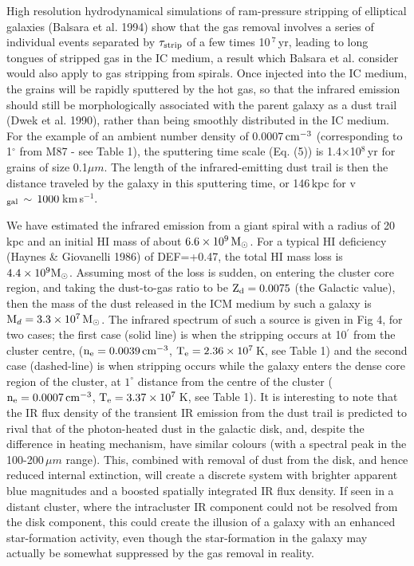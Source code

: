 \documentclass[]{aa}
\begin{document}
High resolution
hydrodynamical simulations of ram-pressure stripping of elliptical
galaxies (Balsara et al. 1994)
show that the gas removal involves a series of individual events
separated by $\tau_{\rm strip}$ of a few times 10$\,^{7}\,$yr, leading to
long tongues of stripped gas in the IC medium, a result which Balsara et al.
consider would also apply to gas stripping from spirals. Once injected into
the IC medium, the grains will be rapidly sputtered by the hot gas, so that
the infrared emission should still be morphologically
associated with the parent galaxy as a dust trail (Dwek et al. 1990),
rather than being smoothly distributed in the IC medium.
For the example
of an ambient number density of 0.0007$\,{\rm cm}^{-3}$ 
(corresponding to 1$^{\circ}$ from M87 - see Table 1), 
the sputtering time scale (Eq. (5)) is 
1.4$\times$10$^{8}\,$yr for grains of size 0.1${\mu}m$. 
The length of the infrared-emitting dust trail is then 
the distance traveled by the galaxy in this sputtering time, or 
146$\,$kpc for v$_{\rm gal}\,\sim\,1000\,$km$\,$s$^{-1}$.

We have estimated the infrared emission from a giant spiral with
a radius of 20\,kpc and an initial HI mass of 
about $6.6\times 10^9\,{\rm M}_{\odot}$. For a typical HI deficiency
(Haynes \& Giovanelli 1986)
of DEF=+0.47, the total HI mass loss is $4.4\times 10^9{\rm M}_{\odot}$.
Assuming most of the loss is sudden, on entering the cluster core region, 
and taking the
dust-to-gas ratio to be ${\rm Z}_{\rm d} = 0.0075$ (the Galactic value), 
then the mass of the dust released in the ICM medium by such a galaxy 
is ${\rm M}_d = 3.3\times 10^7\,{\rm M}_{\odot}$. 
The infrared spectrum of such a
source is given in Fig 4, for two cases; the first case (solid line) 
is when the stripping occurs at 10$^{\prime}$ from the cluster centre, 
(${\rm n}_{\rm e}=0.0039\,{\rm cm}^{-3}$, ${\rm T}_{\rm e} = 
2.36\times 10^7$\,K, see 
Table 1) and the second case (dashed-line) is when stripping occurs while the 
galaxy enters the dense core region of the cluster, at $1^{\circ}$ distance 
from the centre of the cluster (${\rm n}_{\rm e}=0.0007\,{\rm cm}^{-3}$, 
${\rm T}_{\rm e} = 3.37\times 10^7$\,K, see Table 1). It is interesting to note
that the IR flux density of the transient IR emission from the 
dust trail is predicted to rival that of the photon-heated dust in the 
galactic disk, and, despite the difference in heating mechanism,
have similar colours (with a spectral peak in the 100-200$\,{\mu}m$ range). 
This, combined with removal of dust from the disk, and hence reduced internal
extinction, will create a discrete system with brighter apparent blue 
magnitudes and a boosted spatially integrated IR flux density. If seen in a 
distant cluster, where the intracluster IR component could not be resolved from
the disk component, this could create the illusion of a galaxy with an 
enhanced star-formation activity, even though the star-formation in the
galaxy may actually be somewhat suppressed by the gas removal in reality.
\end{document}
